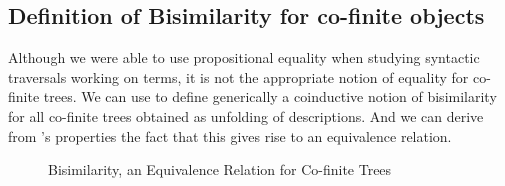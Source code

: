 \subsection{Definition of Bisimilarity for co-finite objects}

Although we were able to use propositional equality when studying
syntactic traversals working on terms, it is not the appropriate
notion of equality for co-finite trees. We can use  to
define generically a coinductive notion of bisimilarity for all
co-finite trees obtained as unfolding of descriptions. And we
can derive from 's properties the fact that this gives
rise to an equivalence relation.

\begin{figure}[h]
\caption{Bisimilarity, an Equivalence Relation for Co-finite Trees}
\end{figure}


